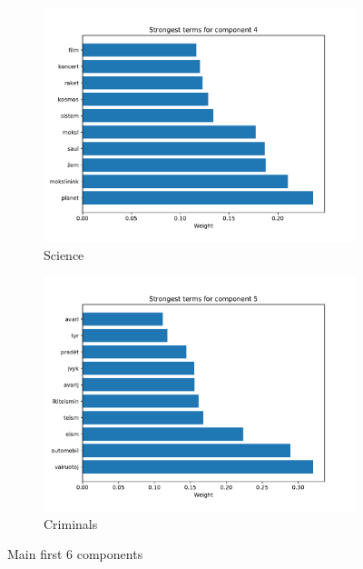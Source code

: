 \documentclass{article}
\begin{document}
\begin{figure}[H]
\begin{subfigure}{.6\textwidth}
		\includegraphics[width=1\linewidth]{images/4_component_lsa.pdf}
		\caption{Science}
		\label{fig:sfig5}
	\end{subfigure}
	\begin{subfigure}{.6\textwidth}
		\centering
		\includegraphics[width=1\linewidth]{images/5_component_lsa.pdf}
		\caption{Criminals}
		\label{fig:sfig6}
	\end{subfigure}
	\caption{Main first 6 components}
	\label{fig:MainComponents}
\end{figure}
\end{document}
